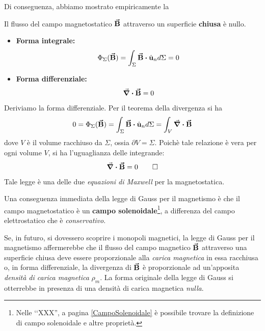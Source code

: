 Di conseguenza, abbiamo mostrato empiricamente la
\begin{theorema}
	Il flusso del campo magnetostatico $\vb*{\va{B}}$ attraverso un superficie \textbf{chiusa} è nullo.
	\begin{itemize}
		\item \textbf{Forma integrale:}
		\begin{equation}
			\Phi_\Sigma(\vba{B})=\int_{\Sigma}\vba{B}\vdot \vbh{u}_nd\Sigma=0\label{LeggeGaussMagnetismoIntegrale}
		\end{equation}
		\item \textbf{Forma differenziale:}
		\begin{equation}
			\div{\vb*{\va{B}}}=0\label{LeggeGaussMagnetismoDifferenziale}
		\end{equation}
	\end{itemize}
\end{theorema}
\begin{demonstration}
	Deriviamo la forma differenziale. Per il teorema della divergenza si ha
	\begin{equation*}
		0=\Phi_\Sigma(\vba{B})=\int_{\Sigma}\vba{B}\vdot \vbh{u}_nd\Sigma=\int_V\div{\vba{B}}
	\end{equation*}
	dove $V$ è il volume racchiuso da $\Sigma$, ossia $\partial V=\Sigma$. Poichè tale relazione è vera per ogni volume $V$, si ha l'uguaglianza delle integrande:
	\begin{equation*}
		\div{\vb*{\va{B}}}=0\qedhere
	\end{equation*}
\end{demonstration}
Tale legge è una delle due \textit{equazioni di Maxwell} per la magnetostatica.

Una conseguenza immediata della legge di Gauss per il magnetismo è che il campo magnetostatico è un \textbf{campo solenoidale}\footnote{Nelle ‘‘XXX'', a pagina \ref{CampoSolenoidale} è possibile trovare la definizione di campo solenoidale e altre proprietà.}, a differenza del campo elettrostatico che è \textit{conservativo}.
\begin{digression}
	Se, in futuro, si dovessero scoprire i monopoli magnetici, la legge di Gauss per il magnetismo affermerebbe che il flusso del campo magnetico $\vb*{\va{B}}$ attraverso una superficie chiusa deve essere proporzionale alla \textit{carica magnetica} in essa racchiusa o, in forma differenziale, la divergenza di $\vb*{\va{B}}$ è proporzionale ad un'apposita \textit{densità di carica magnetica} $\rho_m$. La forma originale della legge di Gauss si otterrebbe in presenza di una densità di carica magnetica \textit{nulla}.
\end{digression}
